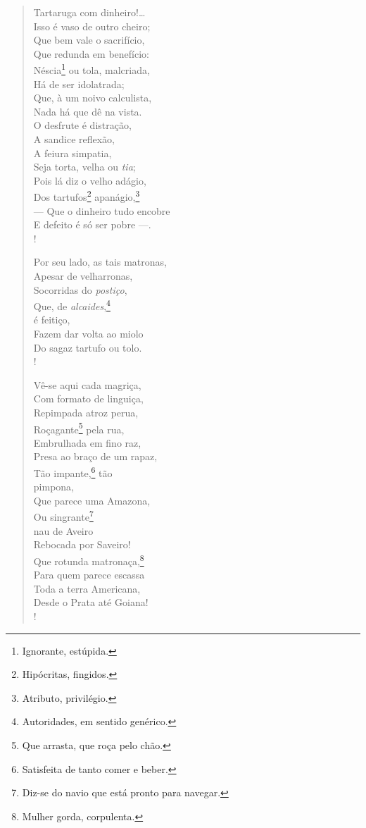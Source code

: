 \begin{verse}
Tartaruga com dinheiro!\ldots{}\\
Isso é vaso de outro cheiro;\\
Que bem vale o sacrifício,\\
Que redunda em benefício:\\
Néscia\footnote{ Ignorante, estúpida.} ou tola, malcriada,\\
Há de ser idolatrada;\\
Que, à um noivo calculista,\\
Nada há que dê na vista.\\
O desfrute é distração,\\
A sandice reflexão,\\
A feiura simpatia,\\
Seja torta, velha ou \emph{tia};\\
Pois lá diz o velho adágio,\\
Dos tartufos\footnote{ Hipócritas, fingidos.} apanágio,\footnote{ Atributo, privilégio.}\\
--- Que o dinheiro tudo encobre\\
E defeito é só ser pobre ---.\\!

Por seu lado, as tais matronas,\\
Apesar de velharronas,\\
Socorridas do \emph{postiço},\\
Que, de \emph{alcaides},\footnote{ Autoridades, em sentido genérico.}\\
é feitiço,\\
Fazem dar volta ao miolo\\
Do sagaz tartufo ou tolo.\\!

Vê-se aqui cada magriça,\\
Com formato de linguiça,\\
Repimpada atroz perua,\\
Roçagante\footnote{ Que arrasta, que roça pelo chão.} pela rua,\\
Embrulhada em fino raz,\\
Presa ao braço de um rapaz,\\
Tão impante,\footnote{ Satisfeita de tanto comer e beber.} tão\\
pimpona,\\
Que parece uma Amazona,\\
Ou singrante\footnote{ Diz-se do navio que está pronto para navegar.}\\
nau de Aveiro\\
Rebocada por Saveiro!\\
Que rotunda matronaça,\footnote{ Mulher gorda, corpulenta.}\\
Para quem parece escassa\\
Toda a terra Americana,\\
Desde o Prata até Goiana!\\!


\end{verse}
